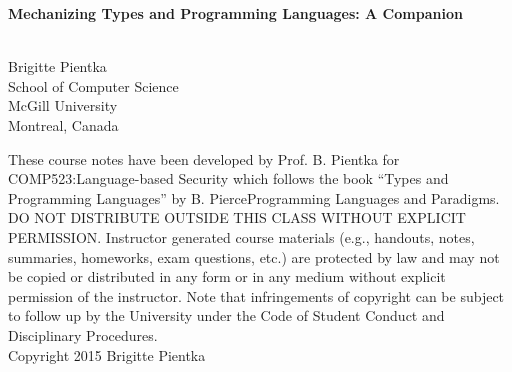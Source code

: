 
\pagestyle{empty}
\vspace{0.5cm}
\begin{center}
\begin{minipage}{15cm}
\begin{center}
\vspace{12mm}
\LARGE
{\bf Mechanizing Types and Programming Languages: A Companion}\\
\end{center}
\end{minipage}
\\
\vspace{2.5cm}
Brigitte Pientka\\
\vspace{1cm}
School of Computer Science\\
McGill University\\
Montreal, Canada
\\[12em]
$\;$
\\[3em]


\parbox{15cm}{\footnotesize{
These course notes have been developed by Prof. B. Pientka for
COMP523:Language-based Security which follows the book ``Types and
Programming Languages'' by B. PierceProgramming Languages and Paradigms. DO NOT DISTRIBUTE OUTSIDE THIS CLASS WITHOUT EXPLICIT PERMISSION. Instructor generated course materials (e.g., handouts, notes, summaries, homeworks, exam questions, etc.) are protected by law and may not be copied or distributed in any form or in any medium without explicit permission of the instructor. Note that infringements of copyright can be subject to follow up by the University under the Code of Student Conduct and Disciplinary Procedures. 
\\[2em]
Copyright 2015 Brigitte Pientka}}
\end{center}

